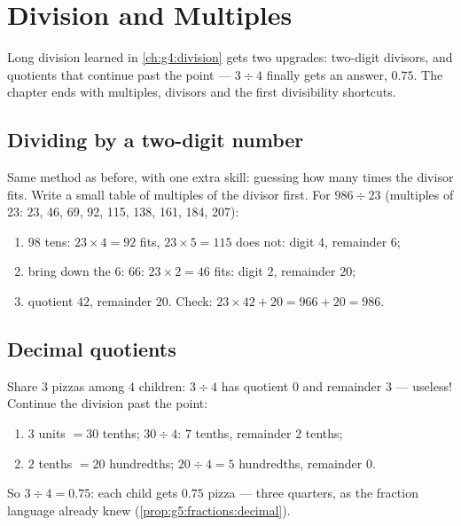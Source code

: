 \chapter{Division and Multiples}\label{ch:g5:division}

Long division learned in \cref{ch:g4:division} gets two upgrades:
two-digit divisors, and quotients that continue past the point ---
$3 \div 4$ finally gets an answer, $0.75$. The chapter ends with
multiples, divisors and the first divisibility shortcuts.

\section{Dividing by a two-digit number}

\begin{method}\label{met:g5:division:twodigits}
Same method as before, with one extra skill: guessing how many times
the divisor fits. Write a small table of multiples of the divisor
first. For $986 \div 23$ (multiples of 23: 23, 46, 69, 92, 115,
138, 161, 184, 207):
\begin{enumerate}
  \item $98$ tens: $23 \times 4 = 92$ fits, $23 \times 5 = 115$ does
        not: digit $4$, remainder $6$;
  \item bring down the $6$: $66$: $23 \times 2 = 46$ fits: digit
        $2$, remainder $20$;
  \item quotient $42$, remainder $20$. Check:
        $23 \times 42 + 20 = 966 + 20 = 986$.
\end{enumerate}
\end{method}

\section{Decimal quotients}

\begin{example}\label{ex:g5:division:decimal}
Share $3$ pizzas among $4$ children: $3 \div 4$ has quotient $0$ and
remainder $3$ --- useless! Continue the division past the point:
\begin{enumerate}
  \item $3$ units $= 30$ tenths; $30 \div 4$: $7$ tenths, remainder
        $2$ tenths;
  \item $2$ tenths $= 20$ hundredths; $20 \div 4 = 5$ hundredths,
        remainder $0$.
\end{enumerate}
So $3 \div 4 = 0.75$: each child gets $0.75$ pizza --- three
quarters, as the fraction language already knew
(\cref{prop:g5:fractions:decimal}).
\end{example}

